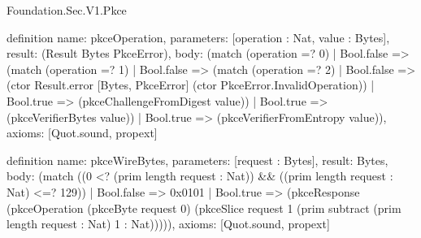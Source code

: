 \begin{lexlean}{Foundation.Sec.V1.Pkce}
\begin{semanticmodule}
definition{
  name: pkceOperation,
  parameters: [operation : Nat, value : Bytes],
  result: (Result Bytes PkceError),
  body: (match (operation =? 0)
    | Bool.false => (match (operation =? 1)
      | Bool.false => (match (operation =? 2)
        | Bool.false => (ctor Result.error [Bytes, PkceError] (ctor PkceError.InvalidOperation))
        | Bool.true => (pkceChallengeFromDigest value))
      | Bool.true => (pkceVerifierBytes value))
    | Bool.true => (pkceVerifierFromEntropy value)),
  axioms: [Quot.sound, propext]
}

definition{
  name: pkceWireBytes,
  parameters: [request : Bytes],
  result: Bytes,
  body: (match ((0 <? (prim length request : Nat)) && ((prim length request : Nat) <=? 129))
    | Bool.false => 0x0101
    | Bool.true => (pkceResponse (pkceOperation (pkceByte request 0) (pkceSlice request 1 (prim subtract (prim length request : Nat) 1 : Nat))))),
  axioms: [Quot.sound, propext]
}
\end{semanticmodule}
\end{lexlean}
